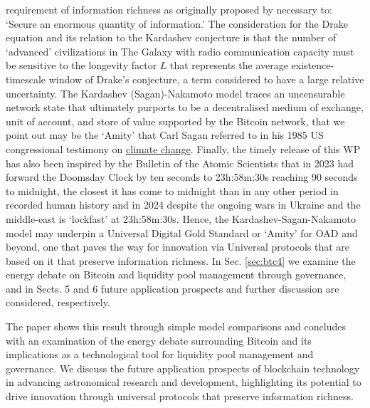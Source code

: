 \documentclass[final,5p,times,twocolumn,authoryear]{elsarticle}
\begin{document}
requirement of information richness as originally proposed by \cite{kar64} necessary to: `Secure an enormous quantity of information.' The consideration for the Drake equation and its relation to the Kardashev conjecture is that the number of `advanced' civilizations in The Galaxy with radio communication capacity must be sensitive to the longevity factor $L$ that represents the average existence-timescale window of Drake's conjecture, a term considered to have a large relative uncertainty. The Kardashev (Sagan)-Nakamoto model traces an uncensurable network state that ultimately purports to be a decentralised medium of exchange, unit of account, and store of value supported by the Bitcoin network, that we point out may be the `Amity' that Carl Sagan referred to in his 1985 US congressional testimony on  \href{https://www.youtube.com/watch?v=Wp-WiNXH6hI}{climate change}. Finally, the timely release of this WP has also been inspired by the Bulletin of the Atomic Scientists that in 2023 had forward the Doomsday Clock by ten seconds to 23h:58m:30s reaching 90 seconds to midnight, the closest it has come to midnight than in any other period in recorded human history and in 2024 despite the ongoing wars in Ukraine and the middle-east is `lockfast' at 23h:58m:30s. Hence, the Kardashev-Sagan-Nakamoto model may underpin a Universal Digital Gold Standard or `Amity' for OAD and beyond, one that paves the way for innovation via Universal protocols that are based on it that preserve information richness.  In Sec. \ref{sec:btc4} we examine the energy debate on Bitcoin and liquidity pool management through governance, and in Sects. 5 and 6 future application prospects and further discussion are considered, respectively.

The paper shows this result through simple model comparisons and concludes with an examination of the energy debate surrounding Bitcoin and its implications as a technological tool for liquidity pool management and governance. We discuss the future application prospects of blockchain technology in advancing astronomical research and development, highlighting its potential to drive innovation through universal protocols that preserve information richness.
\end{document}
